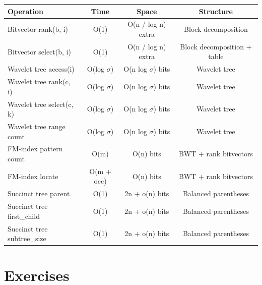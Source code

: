 \begin{center}
\begin{tabular}{lccc}
\toprule
Operation & Time & Space & Structure \\
\midrule
Bitvector rank(b, i) & O(1) & O(n / log n) extra & Block decomposition \\
Bitvector select(b, i) & O(1) & O(n / log n) extra & Block decomposition + table \\
Wavelet tree access(i) & O(log $\sigma$) & O(n log $\sigma$) bits & Wavelet tree \\
Wavelet tree rank(c, i) & O(log $\sigma$) & O(n log $\sigma$) bits & Wavelet tree \\
Wavelet tree select(c, k) & O(log $\sigma$) & O(n log $\sigma$) bits & Wavelet tree \\
Wavelet tree range count & O(log $\sigma$) & O(n log $\sigma$) bits & Wavelet tree \\
FM-index pattern count & O(m) & O(n) bits & BWT + rank bitvectors \\
FM-index locate & O(m + occ) & O(n) bits & BWT + rank bitvectors \\
Succinct tree parent & O(1) & 2n + o(n) bits & Balanced parentheses \\
Succinct tree first\_child & O(1) & 2n + o(n) bits & Balanced parentheses \\
Succinct tree subtree\_size & O(1) & 2n + o(n) bits & Balanced parentheses \\
\bottomrule
\end{tabular}
\end{center}

\section{Exercises}\label{sec22:exercises}

